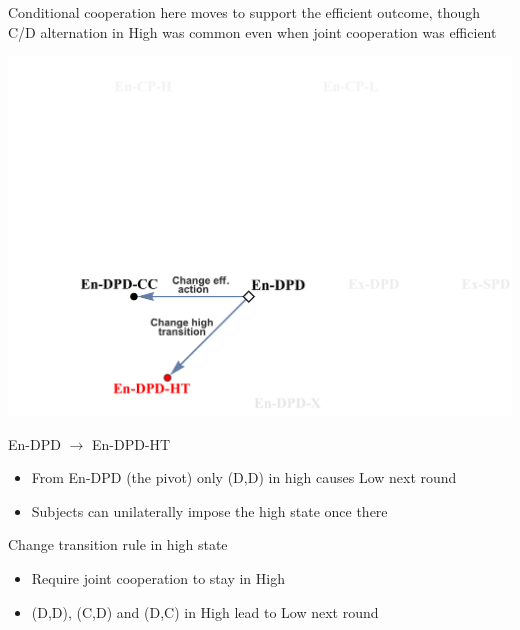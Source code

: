 \documentclass{beamer}
\begin{document}
\begin{frame}
\begin{card}[Result 2]
Conditional cooperation here moves to support the efficient
outcome, though C/D alternation in High was common even when joint
cooperation was efficient
\end{card}
\end{frame}

\begin{frame}
\begin{card}
\begin{center}
\includegraphics[height=0.7\textwidth]{./i/FlowChart3.pdf}
\end{center}
\end{card}
\end{frame}


\begin{frame}{En-DPD $\rightarrow$ En-DPD-HT}
\begin{card}
\begin{itemize}
\item From En-DPD (the pivot) only (D,D) in high causes Low next round
\item Subjects can unilaterally impose the high state once there
\end{itemize}
\end{card}
\begin{card}[Manipulation 2]
 Change transition rule in high state
    \begin{itemize}
    \item Require joint cooperation to stay in High
    \item (D,D), (C,D) and (D,C) in High lead to Low next round
    \end{itemize}
\end{card}
\end{frame}
\end{document}
